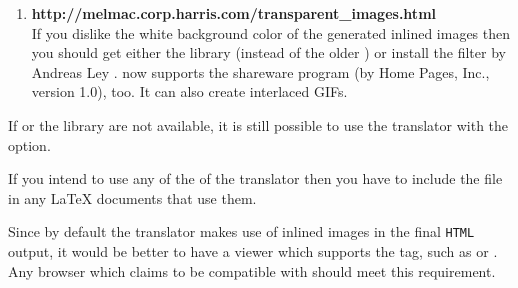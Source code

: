 \begin{enumerate}
%
%
\item 
\textbf{%
{http://melmac.corp.harris.com/transparent\_images.html}}\\
If you dislike the white background color of the
generated inlined images then you should get either 
the  library (instead of the older ) 
or install the 
filter by Andreas Ley . 
\latextohtml{} now supports the shareware program 
(by Home Pages, Inc., version 1.0), too.
It can also create interlaced GIFs.
%
\end{enumerate} 

%

\noindent
If  or the  library are
not available, it is still possible to use the translator with the
 option. 

%
%
\html{\\}%

If you intend to use any of the 
of the translator 
then you have to include the  file 
in any \LaTeX{}  documents that use them. 

%
%
%
%
%
%
\html{\\}%

Since by default the translator makes use of inlined images in the final 
\texttt{HTML} output, it would be better to have a viewer 
which supports the  tag,
such as %
or .
Any browser which claims to be compatible with \HTMLiii{} should meet
this requirement.

